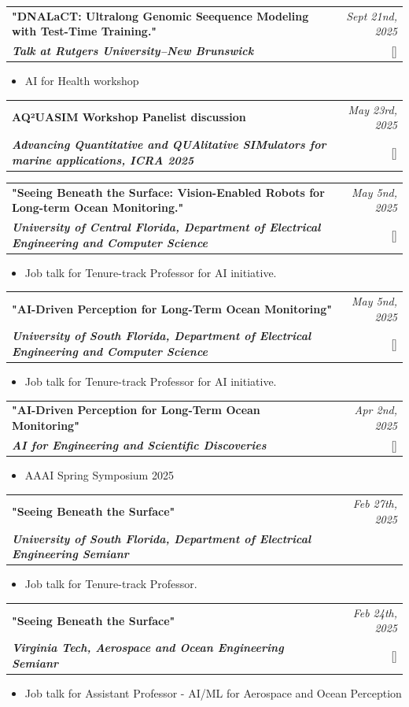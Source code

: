 \documentclass[a4paper,11pt]{article}
\makeatletter
\newcommand{\resumeProject}[4]{
\vspace{0.5mm}\item
    \begin{tabular*}{0.98\textwidth}[t]{l@{\extracolsep{\fill}}r}
        \textbf{#1} & \textit{\footnotesize{#3}} \\
        \footnotesize{\textit{#2}} & \footnotesize{#4}
    \end{tabular*}
    \vspace{-2.4mm}
}
\newcommand{\resumeItemListStart}{\begin{itemize}[leftmargin=*,labelsep=1mm,itemsep=0.5mm]}
\newcommand{\resumeItemListEnd}{\end{itemize}\vspace{-2mm}}
\makeatother
\begin{document}
\resumeProject
  {"DNALaCT: Ultralong Genomic Seequence Modeling with Test-Time Training."}
  {\textbf{Talk at Rutgers University–New Brunswick}}
  {Sept 21nd, 2025}
    {{}[\href{https://xiaominlin.github.io/files/AI_for_Health.jpeg}{\textcolor{darkblue}{\faIcon{globe}}}]}
    \resumeItemListStart
        \item AI for Health workshop
    \resumeItemListEnd
\resumeProject
  {AQ²UASIM Workshop Panelist discussion}
  {\textbf{Advancing Quantitative and QUAlitative SIMulators for marine applications, ICRA 2025}}
  {May 23rd, 2025}
    {{}[\href{https://sites.google.com/view/aq2uasim/panel-discussion?authuser=0}{\textcolor{darkblue}{\faIcon{globe}}}]}    
\resumeProject
  {"Seeing Beneath the Surface: Vision-Enabled Robots for Long-term Ocean Monitoring."}
  {\textbf{University of Central Florida, Department of Electrical Engineering and Computer Science}}
  {May 5nd, 2025}
    {{}[\href{https://www.youtube.com/watch?v=jnJA9kSq22U}{\textcolor{darkblue}{\faIcon{globe}}}]}
    \resumeItemListStart
        \item Job talk for Tenure-track Professor for AI initiative.
    \resumeItemListEnd
    
\resumeProject
  {"AI-Driven Perception for Long-Term Ocean Monitoring"}
  {\textbf{University of South Florida, Department of Electrical Engineering and Computer Science}}
  {May 5nd, 2025}
    {{}[\href{https://www.youtube.com/watch?v=jnJA9kSq22U}{\textcolor{darkblue}{\faIcon{globe}}}]}
    \resumeItemListStart
        \item Job talk for Tenure-track Professor for AI initiative.
    \resumeItemListEnd
    
\resumeProject
  {"AI-Driven Perception for Long-Term Ocean Monitoring"}
  {\textbf{AI for Engineering and Scientific Discoveries}}
  {Apr 2nd, 2025}
    {{}[\href{https://sites.google.com/view/aaai-ss25-ai4science/home}{\textcolor{darkblue}{\faIcon{globe}}}]}
    \resumeItemListStart
        \item AAAI Spring Symposium 2025
    \resumeItemListEnd
\resumeProject
  {"Seeing Beneath the Surface"}
  {\textbf{University of South Florida, Department of Electrical Engineering Semianr}}
  {Feb 27th, 2025}
    {}
    \resumeItemListStart
        \item Job talk for Tenure-track Professor.
    \resumeItemListEnd

\resumeProject
  {"Seeing Beneath the Surface"}
  {\textbf{Virginia Tech, Aerospace and Ocean Engineering Semianr}}
  {Feb 24th, 2025}
    {{}[\href{https://www.aoe.vt.edu/about-us/seminars/Entries/02-24-2025-seminar.html}{\textcolor{darkblue}{\faIcon{globe}}}]}
    \resumeItemListStart
        \item Job talk for Assistant Professor - AI/ML for Aerospace and Ocean Perception
    \resumeItemListEnd
\end{document}
